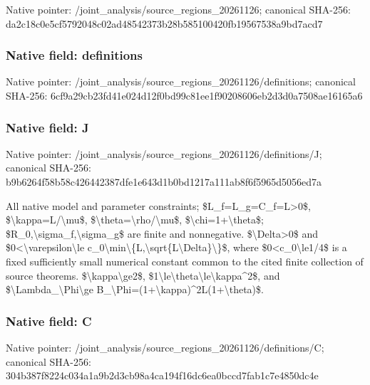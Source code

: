 \documentclass[10pt,a4paper]{article}
\begin{document}
Native pointer: /joint\_analysis/source\_regions\_20261126; canonical SHA-256: da2c18c0e5cf5792048c02ad\allowbreak{}48542373b28b585100420fb1\allowbreak{}9567538a9bd7acd7



\subsubsection{Native field: definitions}


Native pointer: /joint\_analysis/source\_r\allowbreak{}egions\_20261126/definiti\allowbreak{}ons; canonical SHA-256: 6cf9a29cb23fd41e024d12f0\allowbreak{}bd99c81ee1f90208606eb2d3\allowbreak{}d0a7508ae16165a6



\subsubsection{Native field: J}


Native pointer: /joint\_analysis/source\_r\allowbreak{}egions\_20261126/definiti\allowbreak{}ons/J; canonical SHA-256: b9b6264f58b58c426442387d\allowbreak{}fe1e643d1b0bd1217a111ab8\allowbreak{}f6f5965d5056ed7a


All native model and parameter constraints; \$L\_f=L\_g=C\_f=L>0\$, \$\textbackslash{}kappa=L/\textbackslash{}mu\$, \$\textbackslash{}theta=\textbackslash{}rho/\textbackslash{}mu\$, \$\textbackslash{}chi=1+\textbackslash{}theta\$; \$R\_0,\textbackslash{}sigma\_f,\textbackslash{}sigma\_g\$ are finite and nonnegative. \$\textbackslash{}Delta>0\$ and \$0<\textbackslash{}varepsilon\textbackslash{}le c\_0\textbackslash{}min\textbackslash{}\{L,\textbackslash{}sqrt\{L\textbackslash{}Delta\}\textbackslash{}\}\$, where \$0<c\_0\textbackslash{}le1/4\$ is a fixed sufficiently small numerical constant common to the cited finite collection of source theorems. \$\textbackslash{}kappa\textbackslash{}ge2\$, \$1\textbackslash{}le\textbackslash{}theta\textbackslash{}le\textbackslash{}kappa\textasciicircum{}2\$, and \$\textbackslash{}Lambda\_\textbackslash{}Phi\textbackslash{}ge B\_\textbackslash{}Phi=(1+\textbackslash{}kappa)\textasciicircum{}2L(1+\textbackslash{}theta)\$.


\subsubsection{Native field: C}


Native pointer: /joint\_analysis/source\_r\allowbreak{}egions\_20261126/definiti\allowbreak{}ons/C; canonical SHA-256: 304b387f8224c034a1a9b2d3\allowbreak{}cb98a4ca194f16dc6ea0bccd\allowbreak{}7fab1c7e4850dc4e
\end{document}
